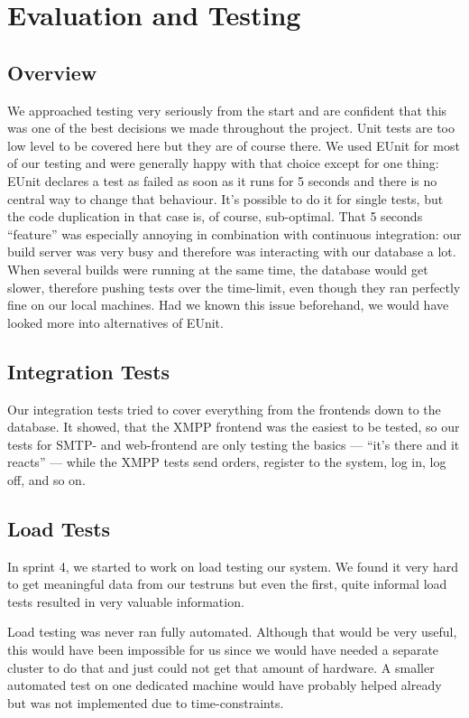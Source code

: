 \documentclass[11pt,a4paper]{report}
\newcommand{\hi}[1]{{\color{red}\em #1\/}\\}
\begin{document}
\chapter{Evaluation and Testing}
\section{Overview}
We approached testing very seriously from the start and are confident that this
was one of the best decisions we made throughout the project. Unit tests are too
low level to be covered here but they are of course there. We used EUnit for
most of our testing and were generally happy with that choice except for one
thing: EUnit declares a test as failed as soon as it runs for 5 seconds and
there is no central way to change that behaviour. It's possible to do it for
single tests, but the code duplication in that case is, of course, sub-optimal.
That 5 seconds ``feature'' was especially annoying in combination with
continuous integration: our build server was very busy and therefore was
interacting with our database a lot. When several builds were running at the
same time, the database would get slower, therefore pushing tests over the
time-limit, even though they ran perfectly fine on our local machines. Had we
known this issue beforehand, we would have looked more into alternatives of
EUnit.

\section{Integration Tests}
Our integration tests tried to cover everything from the frontends down to the
database. It showed, that the XMPP frontend was the easiest to be tested, so
our tests for SMTP- and web-frontend are only testing the basics --- ``it's
there and it reacts'' --- while the XMPP tests send orders, register to the
system, log in, log off, and so on.

\section{Load Tests}
In sprint 4, we started to work on load testing our system. We found it very
hard to get meaningful data from our testruns but even the first, quite informal
load tests resulted in very valuable information.

Load testing was never ran fully automated. Although that would be very useful,
this would have been impossible for us since we would have needed a separate
cluster to do that and just could not get that amount of hardware.
A smaller automated test on one dedicated machine would have probably helped
already but was not implemented due to time-constraints.
\end{document}

